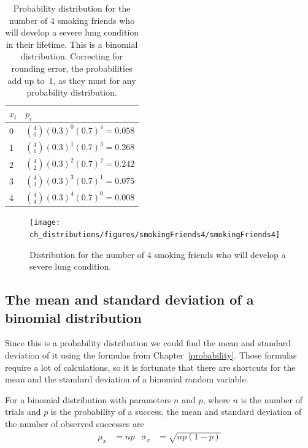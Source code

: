 \begin{table}[h]
\centering
\begin{tabular}{l l}
$x_i$ & $p_i$ \\
\hline
0 &  ${4\choose 0}(0.3)^0(0.7)^{4} = 0.058$ \vspace{1mm}\\
1 &  ${4\choose 1}(0.3)^1(0.7)^{3} = 0.268$  \vspace{1mm}\\
2 & ${4\choose 2}(0.3)^2(0.7)^{2} = 0.242$  \vspace{1mm}\\
3 & ${4\choose 3}(0.3)^3(0.7)^{1} = 0.075$  \vspace{1mm}\\
4 & ${4\choose 4}(0.3)^4(0.7)^{0} = 0.008$  \vspace{1mm}\\
\hline
\end{tabular}
\caption{Probability distribution for the number of 4 smoking friends who will develop a severe lung condition in their lifetime. This is a binomial distribution. Correcting for rounding error, the probabilities add up to~1, as they must for any probability distribution.}
\label{binomDistrSmokers}
\end{table}

\begin{figure}[h]
\centering
\texttt{[image: ch\_distributions/figures/smokingFriends4/smokingFriends4]}
\caption{Distribution for the number of 4 smoking friends who will develop a severe lung condition.}
\label{smokingFriends4}
\end{figure}


\textA{\newpage}

\subsection{The mean and standard deviation of a binomial distribution}

Since this is a probability distribution we could find the mean and standard deviation of it using the formulas from Chapter~\ref{probability}. Those formulas require a lot of calculations, so it is fortunate that there are shortcuts for the mean and the standard deviation of a binomial random variable.

\begin{termBox}{
For a binomial distribution with parameters $n$ and $p$, where $n$ is the number of trials and $p$ is the probability of a success, the mean and standard deviation of the number of observed successes are\vspace{-2mm}
\begin{align}
\mu_x &= np
	&\sigma_x &= \sqrt{np(1-p)}
\label{binomialStats}
\end{align}
}
\end{termBox}


